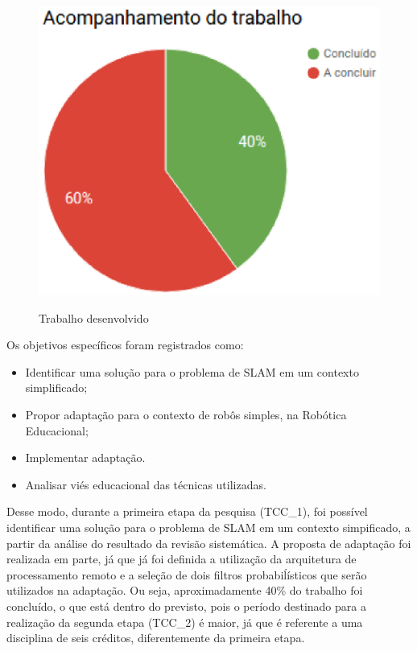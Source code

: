 \begin{figure}[H]
	\centering
	\includegraphics[scale=0.6]{figuras/porcentagem.eps}
	\label{img:porcentagemFinal}
	\caption[Trabalho desenvolvido]{Trabalho desenvolvido}
\end{figure}

Os objetivos específicos foram registrados como:

\begin{itemize}
	\item Identificar uma solução para o problema de SLAM em um contexto simplificado;
	\item Propor adaptação para o contexto de robôs simples, na Robótica Educacional;
	\item Implementar adaptação.
	\item Analisar viés educacional das técnicas utilizadas.
\end{itemize}

Desse modo, durante a primeira etapa da pesquisa (TCC\_1), foi possível identificar uma solução para o problema de SLAM em um contexto simpificado, a partir da análise do resultado da revisão sistemática. A proposta de adaptação foi realizada em parte, já que já foi definida a utilização da arquitetura de processamento remoto e a seleção de dois filtros probabiĺísticos que serão utilizados na adaptação. Ou seja, aproximadamente 40\% do trabalho foi concluído, o que está dentro do previsto, pois o período destinado para a realização da segunda etapa (TCC\_2) é maior, já que é referente a uma disciplina de seis créditos, diferentemente da primeira etapa.

